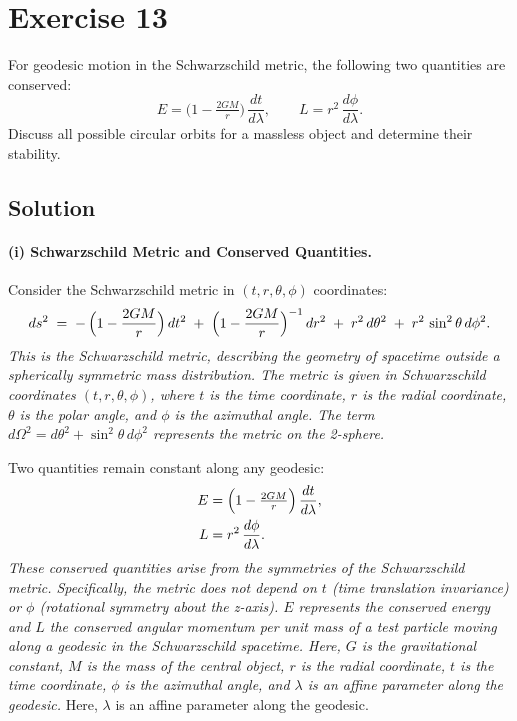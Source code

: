 \documentclass{article}
\begin{document}
\pagebreak

\pagebreak


\section*{Exercise 13}
For geodesic motion in the Schwarzschild metric, the following two quantities are conserved:
\[
E = \bigl(1 - \tfrac{2 G M}{r}\bigr)\,\frac{dt}{d\lambda},
\qquad
L = r^{2}\,\frac{d\phi}{d\lambda}.
\]
Discuss all possible circular orbits for a massless object and determine their stability.

\subsection*{Solution}

\paragraph{(i) Schwarzschild Metric and Conserved Quantities.}
Consider the Schwarzschild metric in \((t,r,\theta,\phi)\) coordinates:
\begin{equation*}
ds^2 \;=\; -\,\Bigl(1 - \frac{2GM}{r}\Bigr)\,dt^2
\;+\;
\Bigl(1 - \frac{2GM}{r}\Bigr)^{-1}\,dr^2
\;+\;
r^2\,d\theta^2
\;+\;
r^2\,\sin^2\theta\,d\phi^2.
\end{equation*}
\textit{This is the Schwarzschild metric, describing the geometry of spacetime outside a spherically symmetric mass distribution. The metric is given in Schwarzschild coordinates $(t, r, \theta, \phi)$, where $t$ is the time coordinate, $r$ is the radial coordinate, $\theta$ is the polar angle, and $\phi$ is the azimuthal angle. The term $d\Omega^2 = d\theta^2 + \sin^2\theta \, d\phi^2$ represents the metric on the 2-sphere.}

Two quantities remain constant along any geodesic:
\begin{align}
E &= \Bigl(1 - \tfrac{2GM}{r}\Bigr)\,\frac{dt}{d\lambda},\\
L &= r^2\,\frac{d\phi}{d\lambda}.
\end{align}
\textit{These conserved quantities arise from the symmetries of the Schwarzschild metric. Specifically, the metric does not depend on $t$ (time translation invariance) or $\phi$ (rotational symmetry about the z-axis). $E$ represents the conserved energy and $L$ the conserved angular momentum per unit mass of a test particle moving along a geodesic in the Schwarzschild spacetime. Here, $G$ is the gravitational constant, $M$ is the mass of the central object, $r$ is the radial coordinate, $t$ is the time coordinate, $\phi$ is the azimuthal angle, and $\lambda$ is an affine parameter along the geodesic.}
Here, \(\lambda\) is an affine parameter along the geodesic.
\end{document}
